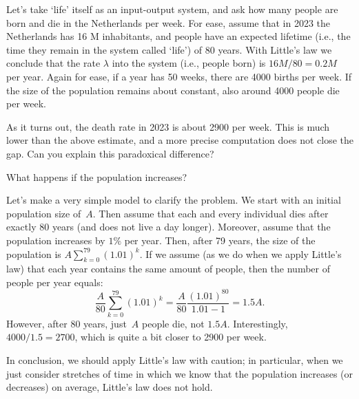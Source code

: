 \documentclass[stochastic-or.tex]{subfiles}
\begin{document}
\begin{exercise}
Let's take `life' itself as an input-output system, and ask how many people are born and die in the Netherlands per week.
For ease, assume that in 2023 the Netherlands has 16 M inhabitants, and people have an expected lifetime (i.e., the time they remain in the system called `life') of 80 years.
With Little's law we conclude that the rate $\lambda$ into the system (i.e., people born) is $16 M/80 = 0.2 M $ per year.
Again for ease, if a year has 50 weeks, there are 4000 births per week.
If the size of the population remains about constant, also around 4000 people die per week.

As it turns out, the death rate in 2023 is about 2900 per week.
This is much lower than the above estimate, and a more precise computation does not close the gap.
Can you explain this paradoxical difference?

\begin{hint}
What happens if the population increases?
\end{hint}
\begin{solution}
Let's make a very simple model to clarify the problem.
We start with an initial population size of~$A$.
Then assume that each and every individual dies after exactly 80 years (and does not live a day longer).
Moreover, assume that the population increases by $1\%$ per year.
Then, after 79 years, the size of the population is $A \sum_{k=0}^{79}(1.01)^{k}$.
If we assume (as we do when we apply Little's law) that each year contains the same amount of people, then the number of people per year equals:
\begin{equation*}
\frac{A}{80}\sum_{k=0}^{79} (1.01)^k = \frac{A}{80} \frac{(1.01)^{80}}{1.01-1} = 1.5 A.
\end{equation*}
However, after 80 years, just~$A$ people die, not $1.5 A$.
Interestingly, $4000/1.5 = 2700$, which is quite a bit closer to 2900 per week.

In conclusion, we should apply Little's law with caution; in particular, when we just consider stretches of time in which we know that the population increases (or decreases) on average, Little's law does not hold.

\end{solution}
\end{exercise}



\end{document}
